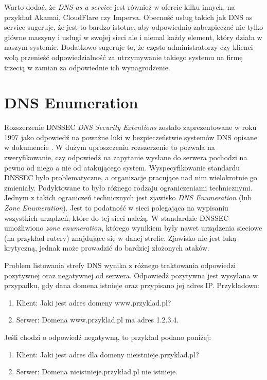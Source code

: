 Warto dodać, że \textit{DNS as a service} jest również w ofercie kilku innych, na przykład Akamai\cite{akamai},
CloudFlare\cite{cloudflare} czy Imperva\cite{incapsula}. Obecność usług takich jak DNS as service sugeruje, że jest to bardzo
istotne, aby odpowiednio zabezpieczać nie tylko główne maszyny i usługi w swojej sieci ale i niemal każdy element, który działa
w naszym systemie. Dodatkowo sugeruje to, że często administratorzy czy klienci wolą przenieść odpowiedzialność za utrzymywanie
takiego systemu na firmę trzecią w zamian za odpowiednie ich wynagrodzenie.

\section{DNS Enumeration}\label{zone_enumeration}
Rozszerzenie DNSSEC \textit{DNS Security Extentions} zostało zaprezentowane w roku 1997\cite{RFC2065} jako odpowiedź na poważne
luki w bezpieczeństwie systemów DNS opisane w dokumencie \cite{DNSsecurityProblem}. W dużym uproszczeniu rozszerzenie to pozwala
na zweryfikowanie, czy odpowiedź na zapytanie wysłane do serwera pochodzi na pewno od niego a nie od atakującego system.
Wyspecyfikowanie standardu DNSSEC było problematyczne, a organizacje pracujące nad nim wielokrotnie go zmieniały. Podyktowane to
było różnego rodzaju ograniczeniami technicznymi. Jednym z takich ograniczeń technicznych jest zjawisko \textit{DNS Enumeration}
(lub \textit{Zone Enumeration}). Jest to podatność w sieci polegająca na wypisaniu wszystkich urządzeń, które do tej sieci należą.
W standardzie DNSSEC umożliwiono \textit{zone enumeration}, którego wynikiem były nawet urządzenia sieciowe (na przykład rutery)
znajdujące się w danej strefie. Zjawisko nie jest luką krytyczną, jednak może prowadzić do bardziej złożonych ataków.

Problem listowania strefy DNS wynika z różnego traktowania odpowiedzi pozytywnej oraz negatywnej od serwera. Odpowiedź pozytywna
jest wysyłana w przypadku, gdy dana domena istnieje oraz przypisano jej adres IP. Przykładowo:
\begin{enumerate}
	\item Klient: Jaki jest adres domeny www.przyklad.pl?
	\item Serwer: Domena www.przyklad.pl ma adres 1.2.3.4.
\end{enumerate}
Jeśli chodzi o odpowiedź negatywną, to przykład podano poniżej:
\begin{enumerate}
	\item Klient: Jaki jest adres dla domeny nieistnieje.przyklad.pl?
	\item Serwer: Domena nieistnieje.przykład.pl nie istnieje.
\end{enumerate}

